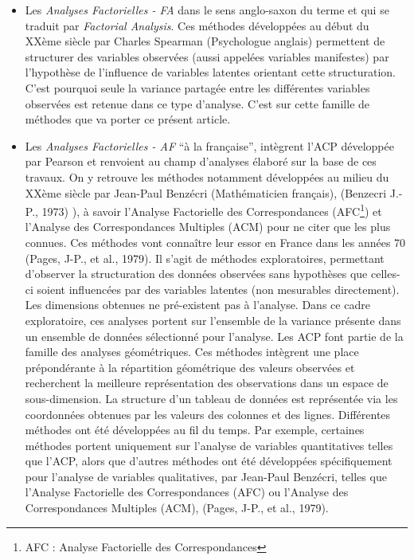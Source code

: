 \documentclass[
  french,
  11pt,
  a4paper,
]{article}
\begin{document}
\begin{itemize}
\item
  Les \emph{Analyses Factorielles - FA} dans le sens anglo-saxon du
  terme et qui se traduit par \emph{Factorial Analysis}. Ces méthodes
  développées au début du XXème siècle par Charles Spearman (Psychologue
  anglais) permettent de structurer des variables observées (aussi
  appelées variables manifestes) par l'hypothèse de l'influence de
  variables latentes orientant cette structuration. C'est pourquoi seule
  la variance partagée entre les différentes variables observées est
  retenue dans ce type d'analyse. C'est sur cette famille de méthodes
  que va porter ce présent article.
\item
  Les \emph{Analyses Factorielles - AF} ``à la française'', intègrent
  l'ACP développée par Pearson et renvoient au champ d'analyses élaboré
  sur la base de ces travaux. On y retrouve les méthodes notamment
  développées au milieu du XXème siècle par Jean-Paul Benzécri
  (Mathématicien français), (Benzecri J.-P., 1973) ), à savoir l'Analyse
  Factorielle des Correspondances (AFC\footnote{AFC : Analyse
    Factorielle des Correspondances}) et l'Analyse des Correspondances
  Multiples (ACM) pour ne citer que les plus connues. Ces méthodes vont
  connaître leur essor en France dans les années 70 (Pages, J-P., et
  al., 1979). Il s'agit de méthodes exploratoires, permettant d'observer
  la structuration des données observées sans hypothèses que celles-ci
  soient influencées par des variables latentes (non mesurables
  directement). Les dimensions obtenues ne pré-existent pas à l'analyse.
  Dans ce cadre exploratoire, ces analyses portent sur l'ensemble de la
  variance présente dans un ensemble de données sélectionné pour
  l'analyse. Les ACP font partie de la famille des analyses
  géométriques. Ces méthodes intègrent une place prépondérante à la
  répartition géométrique des valeurs observées et recherchent la
  meilleure représentation des observations dans un espace de
  sous-dimension. La structure d'un tableau de données est représentée
  via les coordonnées obtenues par les valeurs des colonnes et des
  lignes. Différentes méthodes ont été développées au fil du temps. Par
  exemple, certaines méthodes portent uniquement sur l'analyse de
  variables quantitatives telles que l'ACP, alors que d'autres méthodes
  ont été développées spécifiquement pour l'analyse de variables
  qualitatives, par Jean-Paul Benzécri, telles que l'Analyse Factorielle
  des Correspondances (AFC) ou l'Analyse des Correspondances Multiples
  (ACM), (Pages, J-P., et al., 1979).
\end{itemize}
\end{document}
